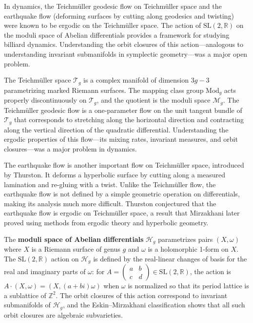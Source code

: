 In dynamics, the Teichm\"uller geodesic flow on Teichm\"uller space and the earthquake flow (deforming surfaces by cutting along geodesics and twisting) were known to be ergodic on the Teichm\"uller space. The action of $\mathrm{SL}(2,\mathbb{R})$ on the moduli space of Abelian differentials provides a framework for studying billiard dynamics. Understanding the orbit closures of this action---analogous to understanding invariant submanifolds in symplectic geometry---was a major open problem.

The Teichm\"uller space $\mathcal{T}_g$ is a complex manifold of dimension $3g-3$ parametrizing marked Riemann surfaces. The mapping class group $\mathrm{Mod}_g$ acts properly discontinuously on $\mathcal{T}_g$, and the quotient is the moduli space $\mathcal{M}_g$. The Teichm\"uller geodesic flow is a one-parameter flow on the unit tangent bundle of $\mathcal{T}_g$ that corresponds to stretching along the horizontal direction and contracting along the vertical direction of the quadratic differential. Understanding the ergodic properties of this flow---its mixing rates, invariant measures, and orbit closures---was a major problem in dynamics.

The earthquake flow is another important flow on Teichm\"uller space, introduced by Thurston. It deforms a hyperbolic surface by cutting along a measured lamination and re-gluing with a twist. Unlike the Teichm\"uller flow, the earthquake flow is not defined by a simple geometric operation on differentials, making its analysis much more difficult. Thurston conjectured that the earthquake flow is ergodic on Teichm\"uller space, a result that Mirzakhani later proved using methods from ergodic theory and hyperbolic geometry.

The \textbf{moduli space of Abelian differentials} $\mathcal{H}_g$ parametrizes pairs $(X, \omega)$ where $X$ is a Riemann surface of genus $g$ and $\omega$ is a holomorphic 1-form on $X$. The $\mathrm{SL}(2,\mathbb{R})$ action on $\mathcal{H}_g$ is defined by the real-linear changes of basis for the real and imaginary parts of $\omega$: for $A = \begin{pmatrix} a & b \\ c & d \end{pmatrix} \in \mathrm{SL}(2,\mathbb{R})$, the action is $A \cdot (X, \omega) = (X, (a + bi)\omega)$ when $\omega$ is normalized so that its period lattice is a sublattice of $\mathbb{Z}^2$. The orbit closures of this action correspond to invariant submanifolds of $\mathcal{H}_g$, and the Eskin--Mirzakhani classification shows that all such orbit closures are algebraic subvarieties.

